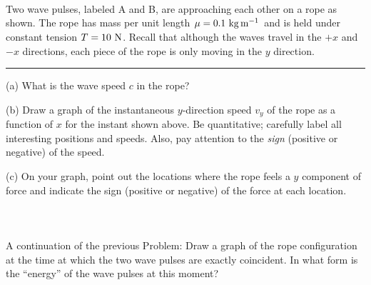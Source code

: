\documentclass[12pt]{article}
\newcounter{problem}
\begin{document}
\paragraph{\problemname~\theproblem}

Two wave pulses, labeled A and B, are approaching each other on a rope
as shown.  The rope has mass per unit length $\mu= 0.1~{\rm
kg\,m^{-1}}$ and is held under constant tension $T= 10~{\rm N}$.
Recall that although the waves travel in the $+x$ and $-x$ directions,
each piece of the rope is only moving in the $y$ direction.
\\ \rule{0.1\textwidth}{0pt}

(a) What is the wave speed $c$ in the rope?

(b) Draw a graph of the instantaneous $y$-direction speed $v_y$ of the
rope as a function of $x$ for the instant shown above.  Be
quantitative; carefully label all interesting positions and speeds.
Also, pay attention to the {\em sign} (positive or negative) of the
speed.

(c) On your graph, point out the locations where the rope feels a $y$
component of force and indicate the sign (positive or negative) of the
force at each location.

\paragraph{\problemname~\theproblem}

A continuation of the previous Problem: Draw a graph of the rope
configuration at the time at which the two wave pulses are exactly
coincident.  In what form is the ``energy'' of the wave pulses at this
moment?

\paragraph{\problemname~\theproblem}
\end{document}
